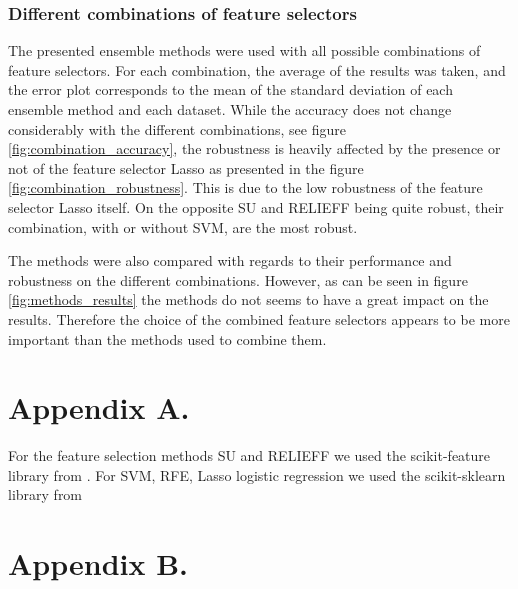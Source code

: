 \documentclass[twoside,11pt]{article}
\begin{document}
\subsubsection{Different combinations of feature selectors}
The presented ensemble methods were used with all possible combinations of feature selectors. For each combination, the average of the results was taken, and the error plot corresponds to the mean of the standard deviation of each ensemble method and each dataset. While the accuracy does not change considerably with the different combinations, see figure \ref{fig:combination_accuracy}, the robustness is heavily affected by the presence or not of the feature selector Lasso as presented in the figure \ref{fig:combination_robustness}. This is due to the low robustness of the feature selector Lasso itself. On the opposite SU and RELIEFF being quite robust, their combination, with or without SVM, are the most robust.  

The methods were also compared with regards to their performance and robustness on the different combinations. However, as can be seen in figure \ref{fig:methods_results} the methods do not seems to have a great impact on the results. Therefore the choice of the combined feature selectors appears to be more important than the methods used to combine them.

\vskip 0.2in


\newpage

\appendix
\section*{Appendix A.}
For the feature selection methods SU and RELIEFF we used the scikit-feature library from \cite{Li-etal16}.
For SVM, RFE, Lasso logistic regression we used the scikit-sklearn library from \cite{scikit-learn}
\label{app:appendixa}
\section*{Appendix B.}
\label{app:appendixb}
\end{document}
